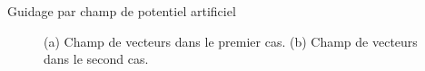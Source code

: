 \documentclass[pdftex,beamer,aspectratio=169]{beamer}
\theoremstyle{definition}
\theoremstyle{example}
\theoremstyle{plain}
\begin{document}
\begin{frame}[fragile]{Guidage par champ de potentiel artificiel}
\begin{figure}[H]
  \caption{(a) Champ de vecteurs dans le premier cas. (b) Champ de vecteurs dans le second cas.}
\end{figure}

\end{frame}
\end{document}
